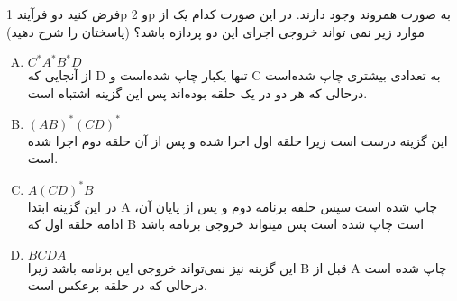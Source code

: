 \documentclass[]{article}
\begin{document}
فرض کنید دو فرآیند 1p و 2p به صورت همروند وجود دارند. در این صورت کدام یک از موارد زیر نمی تواند خروجی اجرای این دو
پردازه باشد؟ (پاسختان را شرح دهید)

\begin{enumerate}[(A)]
    \item $C^* A^* B^* D$ \\
    از آنجایی که
    D
    تنها یکبار چاپ شده‌است و
    C
    به تعدادی بیشتری چاپ شده‌است درحالی که هر دو در یک حلقه بوده‌اند پس این گزینه اشتباه است.
    \item $(AB)^*(CD)^*$ \\
    این گزینه درست است زیرا حلقه اول اجرا شده و پس از آن حلقه دوم اجرا شده است.
    \item $A(CD)^*B$ \\
    در این گزینه ابتدا
    A
    چاپ شده است سپس حلقه برنامه دوم و پس از پایان آن، ادامه حلقه اول که
    B
    است چاپ شده است پس میتواند خروجی برنامه باشد
    \item $BCDA$ \\
    این گزینه نیز نمی‌تواند خروجی این برنامه باشد زیرا
    B
    قبل از
    A
    چاپ شده است درحالی که در حلقه برعکس است.
\end{enumerate}
\end{document}
